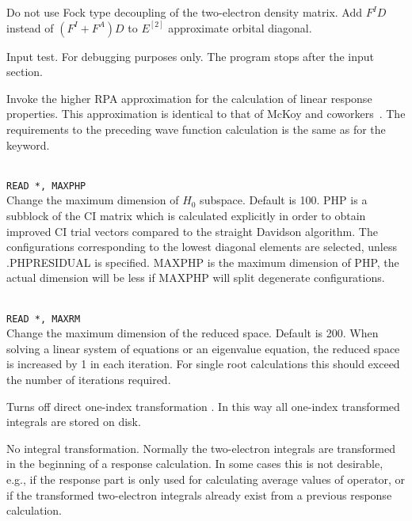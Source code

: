 \begin{description}

\item{}
Do not use Fock type decoupling of the two-electron density matrix.
Add $F^ID$ instead of $(F^I+F^A)D$ to $E^{[2]}$ approximate
orbital diagonal. 

\item{}
Input test. For debugging purposes only. The program stops after the
input section.

\item{}
Invoke the higher RPA approximation for the calculation of linear
response properties. This approximation is identical to that of McKoy
and coworkers~\cite{jrtsvmjcp58,tsjrvmjcp58}. The requirements to the
preceding wave function 
calculation is the same as for the  keyword.

\item{}\\
\verb|READ *, MAXPHP|\\
Change the maximum dimension of $H_0$ subspace.   Default is 100.
PHP is a subblock of the CI matrix which is calculated explicitly
in order to obtain improved CI trial vectors compared to the
straight Davidson algorithm\cite{erdjcp17}.  The configurations
corresponding to 
the lowest diagonal elements are selected, unless .PHPRESIDUAL is
specified. MAXPHP is the maximum dimension of PHP, the 
actual dimension will be less if MAXPHP will split degenerate configurations.
 
\item{}\\
\verb|READ *, MAXRM |\\
Change the maximum dimension of the reduced space. Default is 200.
When solving a linear system of equations or an eigenvalue equation,
the reduced space is increased by 1 in each iteration. For single root
calculations this should exceed the number of iterations required.

\item{}
Turns off direct one-index transformation \cite{ovhahjajjcc15}. 
In this way all one-index
transformed integrals are stored on disk.

\item{}
No integral transformation. Normally the two-electron integrals are 
transformed in the beginning of a response calculation. In some cases
this is not desirable, e.g., if the response part is only used for
calculating average values of operator, or if the transformed two-electron
integrals already exist from a previous response calculation. 


\end{description}
